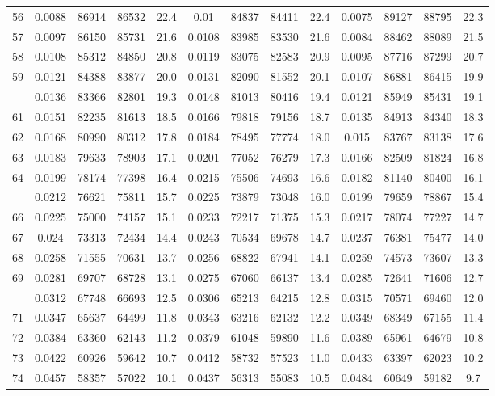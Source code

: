 \documentclass[
  14pt,
]{article}
\begin{document}
\begin{longtable}[t]{lcccccccccccc}
56 & 0.0088 & 86914 & 86532 & 22.4 & 0.01 & 84837 & 84411 & 22.4 & 0.0075 & 89127 & 88795 & 22.3\\
57 & 0.0097 & 86150 & 85731 & 21.6 & 0.0108 & 83985 & 83530 & 21.6 & 0.0084 & 88462 & 88089 & 21.5\\
58 & 0.0108 & 85312 & 84850 & 20.8 & 0.0119 & 83075 & 82583 & 20.9 & 0.0095 & 87716 & 87299 & 20.7\\
59 & 0.0121 & 84388 & 83877 & 20.0 & 0.0131 & 82090 & 81552 & 20.1 & 0.0107 & 86881 & 86415 & 19.9\\
\addlinespace
60 & 0.0136 & 83366 & 82801 & 19.3 & 0.0148 & 81013 & 80416 & 19.4 & 0.0121 & 85949 & 85431 & 19.1\\
61 & 0.0151 & 82235 & 81613 & 18.5 & 0.0166 & 79818 & 79156 & 18.7 & 0.0135 & 84913 & 84340 & 18.3\\
62 & 0.0168 & 80990 & 80312 & 17.8 & 0.0184 & 78495 & 77774 & 18.0 & 0.015 & 83767 & 83138 & 17.6\\
63 & 0.0183 & 79633 & 78903 & 17.1 & 0.0201 & 77052 & 76279 & 17.3 & 0.0166 & 82509 & 81824 & 16.8\\
64 & 0.0199 & 78174 & 77398 & 16.4 & 0.0215 & 75506 & 74693 & 16.6 & 0.0182 & 81140 & 80400 & 16.1\\
\addlinespace
65 & 0.0212 & 76621 & 75811 & 15.7 & 0.0225 & 73879 & 73048 & 16.0 & 0.0199 & 79659 & 78867 & 15.4\\
66 & 0.0225 & 75000 & 74157 & 15.1 & 0.0233 & 72217 & 71375 & 15.3 & 0.0217 & 78074 & 77227 & 14.7\\
67 & 0.024 & 73313 & 72434 & 14.4 & 0.0243 & 70534 & 69678 & 14.7 & 0.0237 & 76381 & 75477 & 14.0\\
68 & 0.0258 & 71555 & 70631 & 13.7 & 0.0256 & 68822 & 67941 & 14.1 & 0.0259 & 74573 & 73607 & 13.3\\
69 & 0.0281 & 69707 & 68728 & 13.1 & 0.0275 & 67060 & 66137 & 13.4 & 0.0285 & 72641 & 71606 & 12.7\\
\addlinespace
70 & 0.0312 & 67748 & 66693 & 12.5 & 0.0306 & 65213 & 64215 & 12.8 & 0.0315 & 70571 & 69460 & 12.0\\
71 & 0.0347 & 65637 & 64499 & 11.8 & 0.0343 & 63216 & 62132 & 12.2 & 0.0349 & 68349 & 67155 & 11.4\\
72 & 0.0384 & 63360 & 62143 & 11.2 & 0.0379 & 61048 & 59890 & 11.6 & 0.0389 & 65961 & 64679 & 10.8\\
73 & 0.0422 & 60926 & 59642 & 10.7 & 0.0412 & 58732 & 57523 & 11.0 & 0.0433 & 63397 & 62023 & 10.2\\
74 & 0.0457 & 58357 & 57022 & 10.1 & 0.0437 & 56313 & 55083 & 10.5 & 0.0484 & 60649 & 59182 & 9.7\\

\end{longtable}
\end{document}
